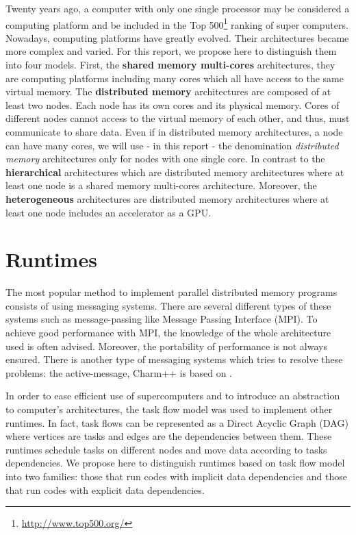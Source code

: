 Twenty years ago, a computer with only one single processor may be considered a computing platform and be included in the Top 500\footnote{\url{http://www.top500.org/}}  ranking of super computers. Nowadays, computing platforms have greatly evolved. Their architectures became more complex and varied. For this report, we propose here to distinguish them into four models. First, the \textbf{shared memory multi-cores} architectures, they are computing platforms including many cores which all have access to the same virtual memory. The \textbf{distributed memory} architectures are composed of at least two nodes. Each node has its own cores and its physical memory. Cores of different nodes cannot access to the virtual memory of each other, and thus, must communicate to share data. Even if in distributed memory architectures, a node can have many cores,  we will use - in this report - the denomination \textit{distributed memory} architectures only for nodes with one single core. In contrast to the \textbf{hierarchical} architectures which are distributed memory architectures where at least one node is a shared memory multi-cores architecture. Moreover, the \textbf{heterogeneous} architectures are distributed memory architectures where at least one node includes an accelerator as a GPU.

\section{Runtimes}
The most popular method to implement parallel distributed memory programs consists of using messaging systems. There are several different types of these systems such as message-passing like Message Passing Interface (MPI)\cite{Message94}. To achieve good performance with MPI, the knowledge of the whole architecture used is often advised. Moreover, the portability of performance is not always ensured. There is another type of messaging systems which tries to resolve these problems: the active-message, Charm++ is based on \cite{KaleLVandK1993b}.

In order to ease efficient use of supercomputers and to introduce an abstraction to computer's architectures, the task flow model was used to implement other runtimes. In fact, task flows can be represented as a Direct Acyclic Graph (DAG) where vertices are tasks and edges are the dependencies between them. These runtimes schedule tasks on different nodes and move data according to tasks dependencies.
We propose here to distinguish runtimes based on task flow model into two families: those that run codes with implicit data dependencies and those that run codes with explicit data dependencies.

